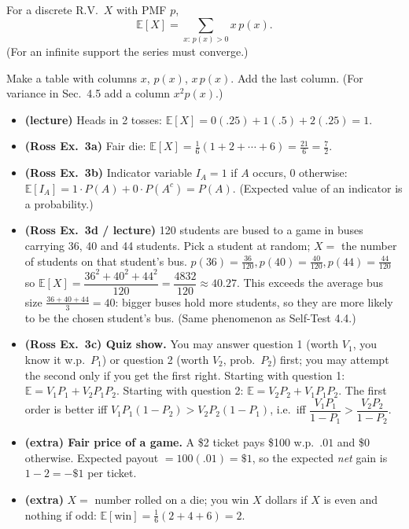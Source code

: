 \documentclass[11pt]{article}
\newcommand{\E}{\mathbb{E}}
\begin{document}
\begin{defbox}
For a discrete R.V.\ $X$ with PMF $p$,
\[ \E[X]=\sum_{x:\,p(x)>0}x\,p(x). \]
(For an infinite support the series must converge.)
\end{defbox}

\begin{methodbox}[{Computing $\E[X]$ with a table}]
Make a table with columns $x$, $p(x)$, $x\,p(x)$. Add the last column. (For variance in Sec.~4.5 add a column $x^2p(x)$.)
\end{methodbox}

\begin{exbox}[Examples]
\begin{itemize}
\item \textbf{(lecture)} Heads in 2 tosses: $\E[X]=0(.25)+1(.5)+2(.25)=1$.
\item \textbf{(Ross Ex.\ 3a)} Fair die: $\E[X]=\tfrac16(1+2+\cdots+6)=\tfrac{21}6=\tfrac72$.
\item \textbf{(Ross Ex.\ 3b)} Indicator variable $I_A=1$ if $A$ occurs, $0$ otherwise: $\E[I_A]=1\cdot P(A)+0\cdot P(A^c)=P(A)$. (Expected value of an indicator is a probability.)
\item \textbf{(Ross Ex.\ 3d / lecture)} 120 students are bused to a game in buses carrying 36, 40 and 44 students. Pick a student at random; $X=$ the number of students on that student's bus. $p(36)=\tfrac{36}{120},p(40)=\tfrac{40}{120},p(44)=\tfrac{44}{120}$ so $\E[X]=\dfrac{36^2+40^2+44^2}{120}=\dfrac{4832}{120}\approx40.27$. This exceeds the average bus size $\tfrac{36+40+44}3=40$: bigger buses hold more students, so they are more likely to be the chosen student's bus. (Same phenomenon as Self-Test 4.4.)
\item \textbf{(Ross Ex.\ 3c) Quiz show.} You may answer question 1 (worth $V_1$, you know it w.p.\ $P_1$) or question 2 (worth $V_2$, prob.\ $P_2$) first; you may attempt the second only if you get the first right. Starting with question 1: $\E=V_1P_1+V_2P_1P_2$. Starting with question 2: $\E=V_2P_2+V_1P_1P_2$. The first order is better iff $V_1P_1(1-P_2)>V_2P_2(1-P_1)$, i.e.\ iff $\dfrac{V_1P_1}{1-P_1}>\dfrac{V_2P_2}{1-P_2}$.
\item \textbf{(extra) Fair price of a game.} A \$2 ticket pays \$100 w.p.\ $.01$ and \$0 otherwise. Expected payout $=100(.01)=\$1$, so the expected \emph{net} gain is $1-2=-\$1$ per ticket.
\item \textbf{(extra)} $X=$ number rolled on a die; you win $X$ dollars if $X$ is even and nothing if odd: $\E[\text{win}]=\tfrac16(2+4+6)=2$.
\end{itemize}
\end{exbox}
\end{document}

